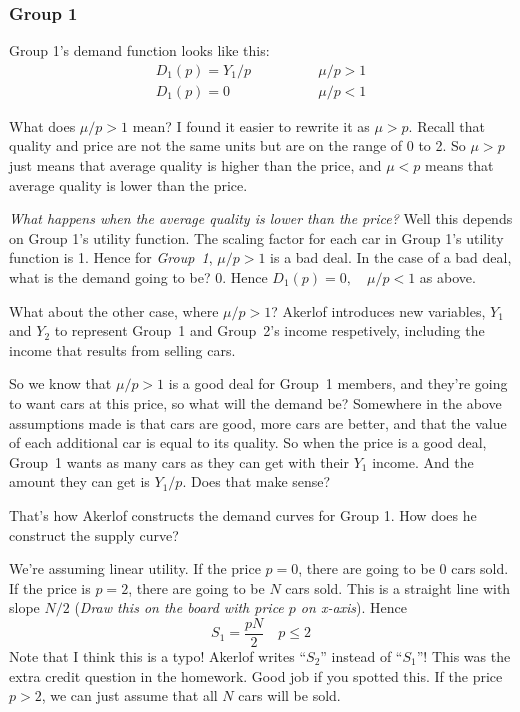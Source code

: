 \documentclass[11pt]{article}
\begin{document}
\subsubsection{Group 1}

Group 1's demand function looks like this:
\begin{align*}
D_1(p) = Y_1/p & \qquad \qquad \mu/p > 1 \\
D_1(p) = 0 & \qquad \qquad \mu/p < 1
\end{align*}

What does $\mu/p > 1$ mean? I found it easier to rewrite it as $\mu > p$. Recall that quality and price are not the same units but are on the range of 0 to 2. So $\mu > p$ just means that average quality is higher than the price, and $\mu < p$ means that average quality is lower than the price. 

{\it What happens when the average quality is lower than the price?} Well this depends on Group 1's utility function. The scaling factor for each car in Group 1's utility function is 1. Hence for {\it Group~1}, $\mu/p > 1$ is a bad deal. In the case of a bad deal, what is the demand going to be? 0. Hence $D_1(p) = 0, \quad \mu/p < 1$ as above.

What about the other case, where $\mu/p > 1$? Akerlof introduces new variables, $Y_1$ and $Y_2$ to represent Group~1 and Group~2's income respetively, including the income that results from selling cars. 

So we know that $\mu/p > 1$ is a good deal for Group~1 members, and they're going to want cars at this price, so what will the demand be? Somewhere in the above assumptions made is that cars are good, more cars are better, and that the value of each additional car is equal to its quality. So when the price is a good deal, Group~1 wants as many cars as they can get with their $Y_1$ income. And the amount they can get is $Y_1/p$. Does that make sense?

That's how Akerlof constructs the demand curves for Group 1. How does he construct the supply curve? 

We're assuming linear utility. If the price $p=0$, there are going to be 0 cars sold. If the price is $p=2$, there are going to be $N$ cars sold. This is a straight line with slope $N/2$ ({\it Draw this on the board with price $p$ on x-axis}). Hence 
\begin{equation}
    S_1 = \frac{pN}{2} \quad p \leq 2
\end{equation}
Note that I think this is a typo! Akerlof writes ``$S_2$'' instead of ``$S_1$''! This was the extra credit question in the homework. Good job if you spotted this. If the price $p>2$, we can just assume that all $N$ cars will be sold. 
\end{document}
